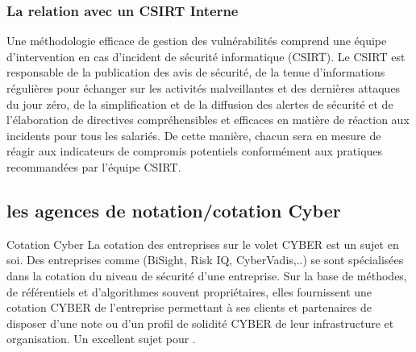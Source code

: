 \subsubsection{La relation avec un CSIRT Interne }

	Une méthodologie efficace de gestion des vulnérabilités comprend une équipe d’intervention en cas d’incident de sécurité informatique (CSIRT). Le CSIRT est responsable de la publication des avis de sécurité, de la tenue d'informations régulières pour échanger sur les activités malveillantes et des dernières attaques du jour zéro, de la simplification et de la diffusion des alertes de sécurité et de l’élaboration de directives compréhensibles et efficaces en matière de réaction aux incidents pour tous les salariés. De cette manière, chacun sera en mesure de réagir aux indicateurs de compromis potentiels conformément aux pratiques recommandées par l'équipe CSIRT.
	
	
\subsection{les agences de notation/cotation Cyber}

\begin{techworkbox}{Cotation Cyber}
	La cotation des entreprises sur le volet CYBER est un sujet en soi. Des entreprises comme (BiSight, Risk IQ, CyberVadis,..) se sont spécialisées dans la cotation du niveau de sécurité d'une entreprise. Sur la base de méthodes, de référentiels et d'algorithmes souvent propriétaires, elles fournissent une cotation CYBER de l'entreprise permettant à ses clients et partenaires de disposer d'une note ou d'un profil de solidité CYBER de leur infrastructure et organisation. Un excellent sujet pour \fichetech.
\end{techworkbox}


